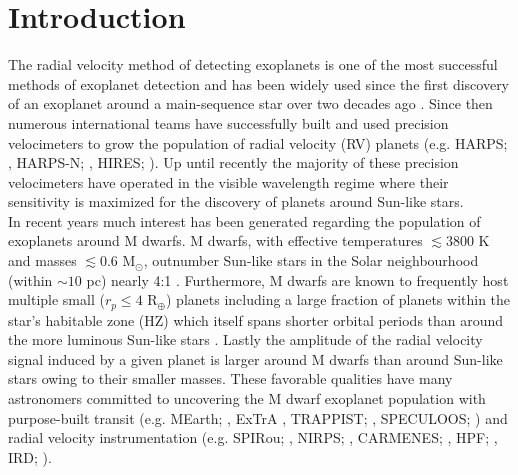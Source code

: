 
\section{Introduction} 
The radial velocity method of detecting exoplanets is one of the most
successful methods of exoplanet detection
and has been widely used since the first discovery of an
exoplanet around a main-sequence star over two decades ago \citep{mayor95}. 
Since then numerous international teams have successfully built and used
precision velocimeters to grow the population of radial velocity (RV) planets
(e.g. HARPS; \citealt{mayor03}, HARPS-N; \citealt{cosentino12}, HIRES; \citealt{vogt94}).
Up until recently the majority of 
these precision velocimeters have operated in the visible wavelength
regime where their sensitivity is maximized for the discovery of planets
around Sun-like stars. \\

In recent years much interest has been generated regarding the population of
exoplanets around M dwarfs. M dwarfs, with effective temperatures
$\lesssim 3800$ K and masses $\lesssim 0.6$ M$_{\odot}$, outnumber Sun-like
stars in the Solar neighbourhood (within $\sim 10$ pc) nearly 4:1
\citep{henry09}. Furthermore, M dwarfs are known to frequently host multiple
small ($r_p \leq 4$ R$_{\oplus}$) planets \citep[e.g.][]{dressing15a, gaidos16}
including a large fraction of planets within the star's habitable zone (HZ)
which itself spans shorter orbital periods than around the more luminous
Sun-like stars \citep{kasting93, kopparapu13}.
Lastly the amplitude of the radial velocity signal induced by a given planet
is larger around M dwarfs than around Sun-like stars owing to their smaller
masses. These favorable qualities have many astronomers 
committed to uncovering the M dwarf exoplanet population with purpose-built
transit (e.g. MEarth; \citealt{irwin15}, ExTrA \citealt{bonfils15},
TRAPPIST; \citealt{gillon11}, SPECULOOS; \citealt{gillon13a})
and radial velocity instrumentation (e.g.
SPIRou; \citealt{delfosse13, artigau14}, NIRPS; \citealt{bouchy17}, CARMENES;
\citealt{quirrenbach14}, HPF; \citealt{mahadevan12}, IRD; \citealt{tamura12}). \\

